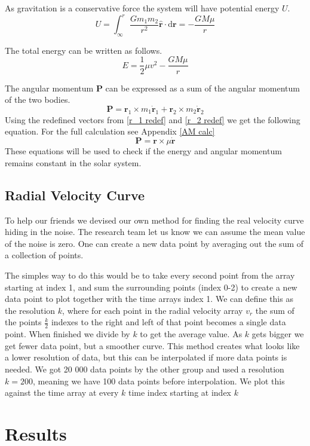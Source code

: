 \documentclass[reprint,english,notitlepage]{revtex4-2}
\begin{document}
As gravitation is a conservative force the system will have potential energy $ U $. 
\[
U = ∫ _{\infty} ^{r} \frac{Gm_1 m_2}{r^{2}}\mathbf{\hat{r}} ⋅ \mathrm{d}\mathbf{r} = - \frac{GM \mu}{r}
\] 

The total energy can be written as follows. 
\[
E = \frac{1}{2}μ v^{2}  - \frac{GM\mu}{r}
\]

The angular momentum $ \mathbf{P} $ can be expressed as a sum of the angular momentum of the two bodies. 
\[
\mathbf{P} = \mathbf{r}_1 \times m_1 \mathbf{\dot{r}}_1 + \mathbf{r}_2 \times m_2 \mathbf{\dot{r}}_2
\]
Using the redefined vectors from \ref{r_1 redef} and \ref{r_2 redef}  we get the following equation. For the full calculation see Appendix \ref{AM calc}
\[
\mathbf{P} = \mathbf{r} \times \mu \mathbf{\dot{r}}
\]
These equations will be used to check if the energy and angular momentum remains constant in the solar system. 

\subsection{Radial Velocity Curve}
	To help our friends we devised our own method for finding the real velocity curve hiding in the noise. The research team let us know we can assume the mean value of the noise is zero. One can create a new data point by averaging out the sum of a collection of points.
	 
	The simples way to do this would be to take every second point from the array starting at index 1, and sum the surrounding points (index 0-2) to create a new data point to plot together with the time arrays index 1. We can define this as the resolution $ k $, where for each point in the radial velocity array $ v_r $ the sum of the points $ \frac{k}{2} $ indexes to the right and left of that point becomes a single data point. When finished we divide by $ k $ to get the average value. As $ k $ gets bigger we get fewer data point, but a smoother curve. This method creates what looks like a lower resolution of data, but this can be interpolated if more data points is needed. We got 20 000 data points by the other group and used a resolution $ k = 200 $, meaning we have 100 data points before interpolation. We plot this against the time array at every $ k $ time index starting at index $ k $


\section{Results}
\end{document}
